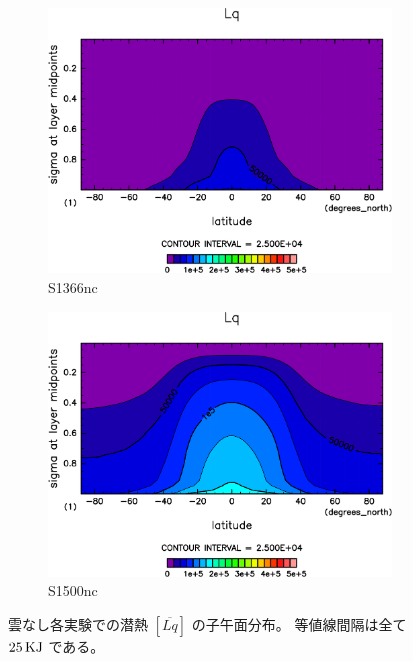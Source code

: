 \documentclass[body]{subfiles}
\begin{document}
\begin{figure}[t]
	\centering
	\begin{subfigure}{.4\textwidth}
		\centering
		\includegraphics[width=\columnwidth]{S1366-nc/Lq,time=3650:4015-crop-rotate.pdf}
		\caption{S1366nc}\label{LqS1366nc}
	\end{subfigure}
	\begin{subfigure}{.4\textwidth}
		\centering
		\includegraphics[width=\columnwidth]{S1500-nc/Lq,time=3650:4015-crop-rotate.pdf}
		\caption{S1500nc}\label{LqS1500nc}
	\end{subfigure}
	\caption[雲なし各実験での潜熱の子午面分布]{
		雲なし各実験での潜熱 \([\overline{Lq}]\) の子午面分布。
		等値線間隔は全て \(25\hmu{KJ}\) である。
	}\label{Lqnc}
\end{figure}
\end{document}
